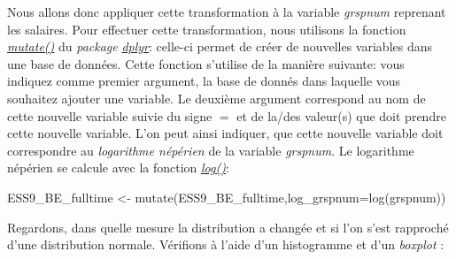 \documentclass[
]{book}
\newenvironment{Shaded}{\begin{snugshade}}{\end{snugshade}}
\newcommand{\AttributeTok}[1]{\textcolor[rgb]{0.77,0.63,0.00}{#1}}
\newcommand{\CommentTok}[1]{\textcolor[rgb]{0.56,0.35,0.01}{\textit{#1}}}
\newcommand{\DecValTok}[1]{\textcolor[rgb]{0.00,0.00,0.81}{#1}}
\newcommand{\FunctionTok}[1]{\textcolor[rgb]{0.00,0.00,0.00}{#1}}
\newcommand{\NormalTok}[1]{#1}
\newcommand{\OtherTok}[1]{\textcolor[rgb]{0.56,0.35,0.01}{#1}}
\newcommand{\SpecialCharTok}[1]{\textcolor[rgb]{0.00,0.00,0.00}{#1}}
\newcommand{\StringTok}[1]{\textcolor[rgb]{0.31,0.60,0.02}{#1}}
\begin{document}
Nous allons donc appliquer cette transformation à la variable \emph{grspnum} reprenant les salaires. Pour effectuer cette transformation, nous utilisons la fonction \href{https://dplyr.tidyverse.org/reference/mutate.html}{\emph{mutate()}} du \emph{package} \href{https://dplyr.tidyverse.org/}{\emph{dplyr}}: celle-ci permet de créer de nouvelles variables dans une base de données. Cette fonction s'utilise de la manière suivante: vous indiquez comme premier argument, la base de donnés dans laquelle vous souhaitez ajouter une variable. Le deuxième argument correspond au nom de cette nouvelle variable suivie du signe \(=\) et de la/des valeur(s) que doit prendre cette nouvelle variable. L'on peut ainsi indiquer, que cette nouvelle variable doit correspondre au \emph{logarithme népérien} de la variable \emph{grspnum}. Le logarithme népérien se calcule avec la fonction \href{https://www.rdocumentation.org/packages/base/versions/3.6.2/topics/log}{\emph{log()}}:

\begin{Shaded}
\begin{Highlighting}[]
\NormalTok{ESS9\_BE\_fulltime }\OtherTok{\textless{}{-}} \FunctionTok{mutate}\NormalTok{(ESS9\_BE\_fulltime,}\AttributeTok{log\_grspnum=}\FunctionTok{log}\NormalTok{(grspnum))}
\end{Highlighting}
\end{Shaded}

Regardons, dans quelle mesure la distribution a changée et si l'on s'est rapproché d'une distribution normale. Vérifions à l'aide d'un histogramme et d'un \emph{boxplot} :

\begin{Shaded}
\end{Shaded}
\end{document}
